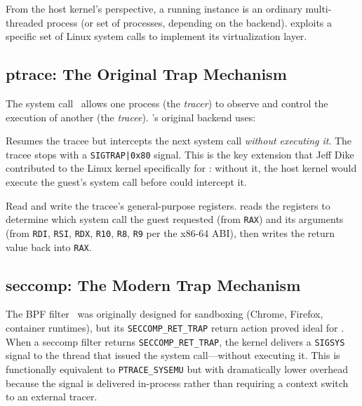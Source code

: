 From the host kernel's perspective, a running \UML{} instance is an
ordinary multi-threaded process (or set of processes, depending on the
backend).  \UML{} exploits a specific set of Linux system calls to
implement its virtualization layer.

\subsection{ptrace: The Original Trap Mechanism}

The  system call~\cite{ptrace-man} allows one process
(the \emph{tracer}) to observe and control the execution of another
(the \emph{tracee}).  \UML{}'s original backend uses:

\begin{description}[style=nextline]
  \item[\texttt{PTRACE\_SYSEMU}.]
    Resumes the tracee but intercepts the next system call
    \emph{without executing it}.  The tracee stops with a
    \texttt{SIGTRAP|0x80} signal.  This is the key extension that
    Jeff Dike contributed to the Linux kernel specifically for
    \UML{}: without it, the host kernel would execute the guest's
    system call before \UML{} could intercept it.

  \item[\texttt{PTRACE\_GETREGS} / \texttt{PTRACE\_SETREGS}.]
    Read and write the tracee's general-purpose registers.  \UML{}
    reads the registers to determine which system call the guest
    requested (from \texttt{RAX}) and its arguments (from
    \texttt{RDI}, \texttt{RSI}, \texttt{RDX}, \texttt{R10},
    \texttt{R8}, \texttt{R9} per the x86-64 ABI), then writes the
    return value back into \texttt{RAX}.
\end{description}

\subsection{seccomp: The Modern Trap Mechanism}

The \Seccomp{} BPF filter~\cite{seccomp-bpf} was originally designed
for sandboxing (Chrome, Firefox, container runtimes), but its
\texttt{SECCOMP\_RET\_TRAP} return action proved ideal for \UML{}.
When a seccomp filter returns \texttt{SECCOMP\_RET\_TRAP}, the kernel
delivers a \texttt{SIGSYS} signal to the thread that issued the
system call---without executing it.  This is functionally equivalent
to \texttt{PTRACE\_SYSEMU} but with dramatically lower overhead
because the signal is delivered in-process rather than requiring a
context switch to an external tracer.

